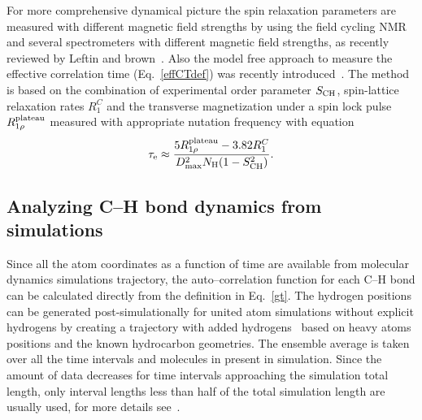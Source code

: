 \documentclass[aps,prl,superscriptaddress,twocolumn]{revtex4}
\begin{document}
For more comprehensive dynamical picture the spin relaxation parameters are 
measured with different magnetic field strengths by using the field cycling NMR~\cite{roberts04a,roberts04b,roberts09,sivanandam09}
and several spectrometers with different magnetic field strengths, as recently reviewed by Leftin and brown~\cite{leftin11}.
Also the model free approach to measure the effective correlation time (Eq.~\ref{effCTdef}) was recently
introduced~\cite{ferreira15}. The method is based on the combination of experimental order parameter $S_{{\rm CH}}$,
spin-lattice relaxation rates $R_1^C$ and the transverse magnetization under a spin lock pulse $R_{1\rho}^{\rm{plateau}}$ 
measured with appropriate nutation frequency with equation
\begin{equation}\label{ECT}
\tau_{\rm{e}}\approx\frac{5R_{1\rho}^{\rm{plateau}}-3.82R_1^C}{D_{\rm{max}}^2N_{\rm{H}}(1-S_{\rm{CH}}^2)}.
\end{equation} 


\subsection{Analyzing C--H bond dynamics from simulations}

Since all the atom coordinates as a function of time are available from molecular dynamics simulations trajectory,
the auto--correlation function for each C--H bond can be calculated directly from the definition in Eq.~\ref{gt}.
The hydrogen positions can be generated post-simulationally for united atom simulations without explicit hydrogens 
by creating a trajectory with added hydrogens~\cite{lindahl01,wohlert06,ollila07a,ferreira15} based on heavy atoms 
positions and the known hydrocarbon geometries. The ensemble average is taken over all the time intervals and molecules 
in present in simulation. Since the amount of data decreases for time intervals approaching the simulation total length,
only interval lengths less than half of the total simulation length are usually used, for more details see~\cite{gromacsMANUAL}.
\end{document}

